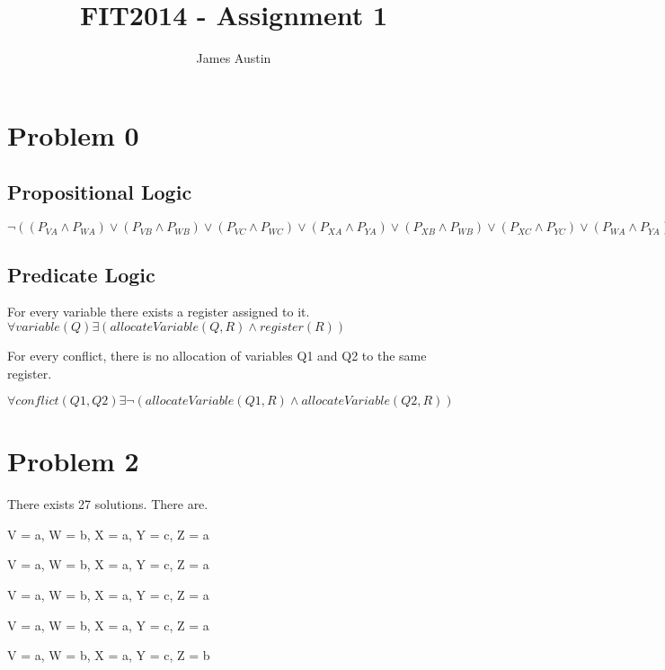 \documentclass[11pt, oneside]{article}   	%
\title{FIT2014 - Assignment 1}
\author{James Austin}
\begin{document}
\maketitle
\section{Problem 0}
\subsection{Propositional Logic}
$\neg ((P_{VA} \wedge P_{WA}) \vee (P_{VB} \wedge P_{WB}) \vee (P_{VC} \wedge P_{WC}) \vee (P_{XA} \wedge P_{YA}) \vee (P_{XB} \wedge P_{WB}) \vee (P_{XC} \wedge P_{YC}) \vee (P_{WA} \wedge P_{YA}) \vee (P_{WB} \wedge P_{WB}) \vee (P_{WC} \wedge P_{YC}) \vee (P_{YA} \wedge P_{ZA}) \vee (P_{YB} \wedge P_{WB}) \vee (P_{YC} \wedge P_{ZC}))$


\subsection{Predicate Logic}

For every variable there exists a register assigned to it.\\
$\forall  variable(Q) \exists (allocateVariable(Q,R) \wedge register(R))$

For every conflict, there is no allocation of variables Q1 and Q2 to the same register.

$\forall conflict(Q1,Q2) \exists \neg(allocateVariable(Q1,R)\wedge allocateVariable(Q2,R))$
\section{Problem 2}
There exists 27 solutions. There are.

V = a,
W = b,
X = a,
Y = c,
Z = a

V = a,
W = b,
X = a,
Y = c,
Z = a

V = a,
W = b,
X = a,
Y = c,
Z = a

V = a,
W = b,
X = a,
Y = c,
Z = a

V = a,
W = b,
X = a,
Y = c,
Z = b
\end{document}
